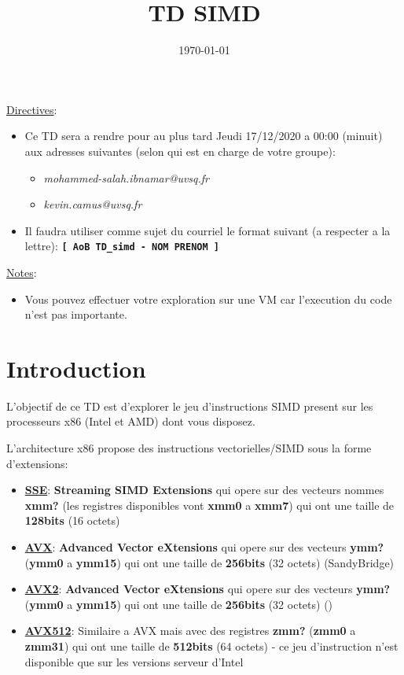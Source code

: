 \documentclass[11pt]{article}
\date{\today}
\title{TD SIMD}
\begin{document}
\maketitle
\tableofcontents

\uline{Directives}:

\begin{itemize}
\item Ce TD sera a rendre pour au plus tard Jeudi 17/12/2020 a 00:00 (minuit) aux adresses suivantes (selon qui est en charge de votre groupe): 

\begin{itemize}
\item \emph{mohammed-salah.ibnamar@uvsq.fr}
\item \emph{kevin.camus@uvsq.fr}
\end{itemize}

\item Il faudra utiliser comme sujet du courriel le format suivant (a respecter a la lettre): \textbf{\texttt{[ AoB TD\_simd - NOM PRENOM ]}}
\end{itemize}

\uline{Notes}:

\begin{itemize}
\item Vous pouvez effectuer votre exploration sur une VM car l'execution du code n'est pas importante.
\end{itemize}

\section{Introduction}
\label{sec:orga7d5a6a}

L'objectif de ce TD est d'explorer le jeu d'instructions SIMD present 
sur les processeurs x86 (Intel et AMD) dont vous disposez.

L'architecture x86 propose des instructions vectorielles/SIMD sous la forme d'extensions:

\begin{itemize}
\item \uline{\textbf{SSE}}: \textbf{Streaming SIMD Extensions} qui opere sur des vecteurs nommes \textbf{xmm?} (les registres disponibles vont \textbf{xmm0} a \textbf{xmm7}) qui ont une taille de \textbf{128bits} (16 octets)
\item \uline{\textbf{AVX}}: \textbf{Advanced Vector eXtensions} qui opere sur des vecteurs \textbf{ymm?} (\textbf{ymm0} a \textbf{ymm15}) qui ont une taille de \textbf{256bits} (32 octets) (SandyBridge)
\item \uline{\textbf{AVX2}}: \textbf{Advanced Vector eXtensions} qui opere sur des vecteurs \textbf{ymm?} (\textbf{ymm0} a \textbf{ymm15}) qui ont une taille de \textbf{256bits} (32 octets) ()
\item \uline{\textbf{AVX512}}: Similaire a AVX mais avec des registres \textbf{zmm?} (\textbf{zmm0} a \textbf{zmm31}) qui ont une taille de \textbf{512bits} (64 octets) - ce jeu d'instruction n'est disponible que sur les versions serveur d'Intel
\end{itemize}
\end{document}
